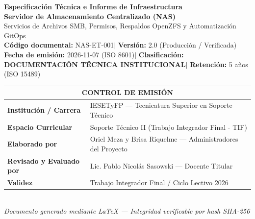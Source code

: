 \documentclass[10pt,a4paper]{article}
\begin{document}

\begin{center}
    {\huge\textbf{\sffamily\color{primaryblue}Especificación Técnica e Informe de Infraestructura}}\\[0.2cm]
    {\Large\textbf{\sffamily Servidor de Almacenamiento Centralizado (NAS)}}\\[0.15cm]
    {\normalsize\textsf{Servicios de Archivos SMB, Permisos, Respaldos OpenZFS y Automatización GitOps}}\\[0.4cm]

    \textsf{\textbf{Código documental:}} NAS-ET-001\quad$|$\quad
    \textsf{\textbf{Versión:}} 2.0 (Producción / Verificada)\\[0.1cm]
    \textsf{\textbf{Fecha de emisión:}} 2026-11-07 (ISO 8601)\quad$|$\quad
    \textsf{\textbf{Clasificación:}} \textbf{\textcolor{primaryblue}{DOCUMENTACIÓN TÉCNICA INSTITUCIONAL}}\quad$|$\quad
    \textsf{\textbf{Retención:}} 5 años (ISO 15489)\\[0.3cm]

    \small
    \begin{tabular}{|p{4.2cm}|p{11.5cm}|}
        \hline
        \multicolumn{2}{|c|}{\textbf{\textsf{CONTROL DE EMISIÓN}}} \\
        \hline
        \textbf{\textsf{Institución / Carrera}} & IESETyFP — Tecnicatura Superior en Soporte Técnico \\
        \hline
        \textbf{\textsf{Espacio Curricular}} & Soporte Técnico II (Trabajo Integrador Final - TIF) \\
        \hline
        \textbf{\textsf{Elaborado por}} & Oriel Meza y Brisa Riquelme — Administradores del Proyecto \\
        \hline
        \textbf{\textsf{Revisado y Evaluado por}} & Lic. Pablo Nicolás Sasowski — Docente Titular \\
        \hline
        \textbf{\textsf{Validez}} & Trabajo Integrador Final / Ciclo Lectivo 2026 \\
        \hline
    \end{tabular}
    \\[0.2cm]
    {\footnotesize\textit{Documento generado mediante \LaTeX{} — Integridad verificable por hash SHA-256}}
\end{center}
\end{document}

